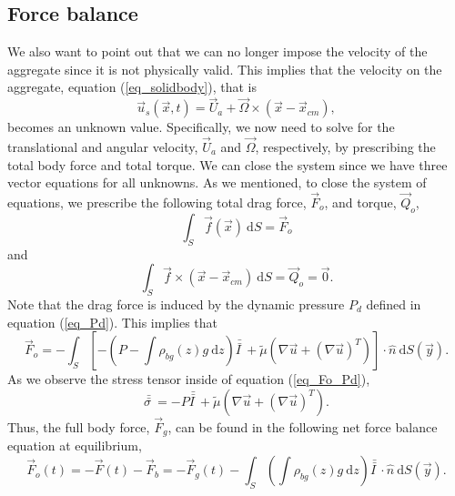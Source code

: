 \subsection{Force balance}
\label{sec:force_balance}
\par
We also want to point out that we can no longer impose the velocity of the aggregate since it is not physically valid.
This implies that the velocity on the aggregate, equation (\ref{eq_solidbody}), that is
\begin{equation}
	\vec{u}_s (\vec{x}, t)  = \vec{U}_a + \vec{\Omega} \times (\vec{x}- \vec{x}_{cm}),
	\nonumber
\end{equation}
becomes an unknown value. Specifically, we now need to solve for the translational and angular velocity, $\vec{U}_a$ and $\vec{\Omega}$, respectively, by prescribing the total body force and total torque. 
We can close the system since we have three vector equations for all unknowns. 
As we mentioned, to close the system of equations, we prescribe the following total drag force, $\vec{F}_o$, and torque, $\vec{Q}_o $,
\begin{equation}
	\int_S \vec{f} (\vec{x}) \ \textrm{d}S = \vec{F}_o
\label{eq_Fo}
\end{equation}
and
\begin{equation}
	\int_S \vec{f}\times (\vec{x} - \vec{x}_{cm}) \ \textrm{d}S = \vec{Q}_o = \vec{0}.
\label{eq_Qo}
\end{equation}
 Note that the drag force is induced by the dynamic pressure $P_d$ defined in equation (\ref{eq_Pd}). This implies that 
\begin{equation}
	\vec{F}_o 
	 = - \int_S \left[ 
	 - \left( P -  \int \rho_{bg}(z) g \ \textrm{d}z \right) \bar{\bar{I \ }} 
	 + \tilde{\mu} \left( \nabla \vec{u} + (\nabla \vec{u})^{T} \right)
	 \right] \cdot \hat{n} \ \textrm{d}S (\vec{y}).
\label{eq_Fo_Pd}
\end{equation}
As we observe the stress tensor inside of equation (\ref{eq_Fo_Pd}), 
\begin{equation}
	\bar{\bar{\sigma \ }} = 
 -  P  \bar{\bar{I \ }} 
 + \tilde{\mu} \left( \nabla \vec{u} + (\nabla \vec{u})^{T} \right).
\end{equation}
Thus, the full body force, $\vec{F}_g$, can be found in the following net force balance equation at equilibrium,
\begin{equation}
	\vec{F}_o (t)
	= - \vec{F}(t) - \vec{F}_b
	  = - \vec{F}_g(t)
	  -  \int_S \left( 
	   \int \rho_{bg}(z) g \ \textrm{d}z 
	 \right) \bar{\bar{I \ }}  \cdot
	\hat{n} \ \textrm{d}S (\vec{y}).
\label{eq_Full_Force}
\end{equation}
